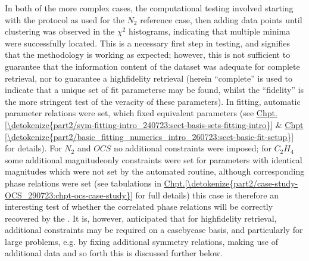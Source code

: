 \documentclass[letterpaper,table,10pt,english]{jupyterBook}
\begin{document}
\sphinxAtStartPar
In both of the more complex cases, the computational testing involved starting with the protocol as used for the \(N_2\) reference case, then adding data points until clustering was observed in the \(\chi^2\) histograms, indicating that multiple minima were successfully located. This is a necessary first step in testing, and signifies that the methodology is working as expected; however, this is not sufficient to guarantee that the information content of the dataset was adequate for complete {\hyperref[\detokenize{backmatter/glossary:term-radial-matrix-elements}]{}} retrieval, nor to guarantee a high\sphinxhyphen{}fidelity retrieval (herein “complete” is used to indicate that a unique set of fit parameterse may be found, whilst the “fidelity” is the more stringent test of the veracity of these parameters). In fitting, automatic parameter relations were set, which fixed equivalent parameters (see \hyperref[\detokenize{part2/sym-fitting-intro_240723:sect-basis-sets-fitting-intro}]{Chpt.\@ \ref{\detokenize{part2/sym-fitting-intro_240723:sect-basis-sets-fitting-intro}}} \& \hyperref[\detokenize{part2/basic_fitting_numerics_intro_260723:sect-basic-fit-setup}]{Chpt \ref{\detokenize{part2/basic_fitting_numerics_intro_260723:sect-basic-fit-setup}}} for details). For \(N_2\) and \(OCS\) no additional constraints were imposed; for \(C_2H_4\) some additional magnitude\sphinxhyphen{}only constraints were set for parameters with identical magnitudes which were not set by the automated routine, although corresponding phase relations were  set (see tabulations in \hyperref[\detokenize{part2/case-study-OCS_290723:chpt-ocs-case-study}]{Chpt.\@ \ref{\detokenize{part2/case-study-OCS_290723:chpt-ocs-case-study}}} for full details) \sphinxhyphen{} this case is therefore an interesting test of whether the correlated phase relations will be correctly recovered by the {\hyperref[\detokenize{backmatter/glossary:term-bootstrap-retrieval-protocol}]{}}. It is, however, anticipated that for high\sphinxhyphen{}fidelity retrieval, additional constraints may be required on a case\sphinxhyphen{}by\sphinxhyphen{}case basis, and particularly for large problems, e.g. by fixing additional symmetry relations, making use of additional data and so forth \sphinxhyphen{} this is discussed further below.
\end{document}
